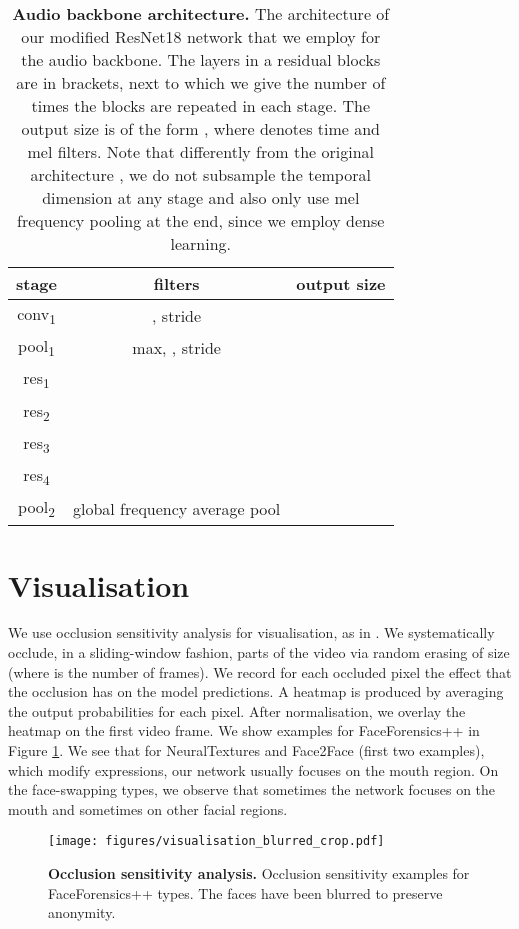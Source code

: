 \documentclass[10pt,twocolumn,letterpaper]{article}
\begin{document}
\begin{table}[tb]
\begin{center}
\begin{tabular}{c | c | c}
stage & filters & output size  \\ \toprule
conv\textsubscript{1} & , stride  &  \\ \midrule
pool\textsubscript{1} & max, , stride  &  \\ \midrule
res\textsubscript{1} &  &  \\ \midrule
res\textsubscript{2} &  &  \\ \midrule
res\textsubscript{3} &  &  \\ \midrule
res\textsubscript{4} &  &  \\ \midrule
pool\textsubscript{2} & global frequency average pool &  \\ \midrule
\end{tabular}
\end{center}
\caption{\textbf{Audio backbone architecture.} The architecture of our modified ResNet18 \cite{he2016deep} network that we employ for the audio backbone. The layers in a residual blocks are in brackets, next to which we give the number of times the blocks are repeated in each stage. The output size is of the form , where  denotes time and  mel filters. Note that differently from the original architecture \cite{he2016deep}, we do not subsample the temporal dimension at any stage and also only use mel frequency pooling at the end, since we employ dense learning.}
\label{table:rn_arch}
\end{table}

\section{Visualisation}
We use occlusion sensitivity analysis \cite{zeiler2014visualizing} for visualisation, as in \cite{haliassos2021lips}. We systematically occlude, in a sliding-window fashion, parts of the video via random erasing of size  (where  is the number of frames). We record for each occluded pixel the effect that the occlusion has on the model predictions. A heatmap is produced by averaging the output probabilities for each pixel. After normalisation, we overlay the heatmap on the first video frame. We show examples for FaceForensics++ in Figure \ref{fig:occlusion_sensitivity}. We see that for NeuralTextures and Face2Face (first two examples), which modify expressions, our network usually focuses on the mouth region. On the face-swapping types, we observe that sometimes the network focuses on the mouth and sometimes on other facial regions.

\begin{figure}
\centering
  \centerline{\texttt{[image: figures/visualisation\_blurred\_crop.pdf]}}
 \caption{\textbf{Occlusion sensitivity analysis.} Occlusion sensitivity examples for FaceForensics++ types. The faces have been blurred to preserve anonymity.}
 \label{fig:occlusion_sensitivity}
\end{figure}
\end{document}
